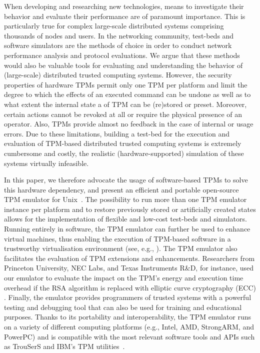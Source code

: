 \documentclass[runningheads]{llncs}
\begin{document}
When developing and researching new technologies, means to investigate their behavior and evaluate
their performance are of paramount importance. This is particularly true for complex large-scale
distributed systems comprising thousands of nodes and users.
In the networking community, test-beds and software simulators are the methods of choice in order
to conduct network performance analysis and protocol evaluations. We argue that these methods would
also be valuable tools for evaluating and understanding the behavior of (large-scale) distributed
trusted computing systems. However, the security properties of hardware TPMs permit only one TPM
per platform and limit the degree to which the effects of an executed command can be undone as well
as to what extent the internal state a of TPM can be (re)stored or preset. Moreover, certain actions
cannot be revoked at all or require the physical presence of an operator. Also, TPMs provide almost
no feedback in the case of internal or usage errors. Due to these limitations, building a test-bed
for the execution and evaluation of TPM-based distributed trusted computing systems is extremely
cumbersome and costly, the realistic (hardware-supported) simulation of these systems virtually
infeasible.

In this paper, we therefore advocate the usage of software-based TPMs to solve this hardware
dependency, and present an efficient and portable open-source TPM emulator for Unix~\cite{TPMEmu}.
The possibility to run more than one TPM emulator instance per platform and to restore previously
stored or artificially created states allows for the implementation of flexible and low-cost
test-beds and simulators. Running entirely in software, the TPM emulator can further be used to
enhance virtual machines, thus enabling the execution of TPM-based software in a trustworthy
virtualisation environment (see, e.g., \cite{Xen}). The TPM emulator also facilitates the
evaluation of TPM extensions and enhancements. Researchers from Princeton University, NEC Labs, and
Texas Instruments R\&D, for instance, used our emulator to evaluate the impact on the TPM's energy
and execution time overhead if the RSA algorithm is replaced with elliptic curve cryptography (ECC)
\cite{Aaraj}. Finally, the emulator provides programmers of trusted systems with a powerful testing
and debugging tool that can also be used for training and educational purposes. Thanks to its
portability and interoperability, the TPM emulator runs on a variety of different computing
platforms (e.g., Intel, AMD, StrongARM, and PowerPC) and is compatible with the most relevant
software tools and APIs such as TrouSerS \cite{trousers} and IBM's TPM
utilities~\cite{IBMtools}.
\end{document}
